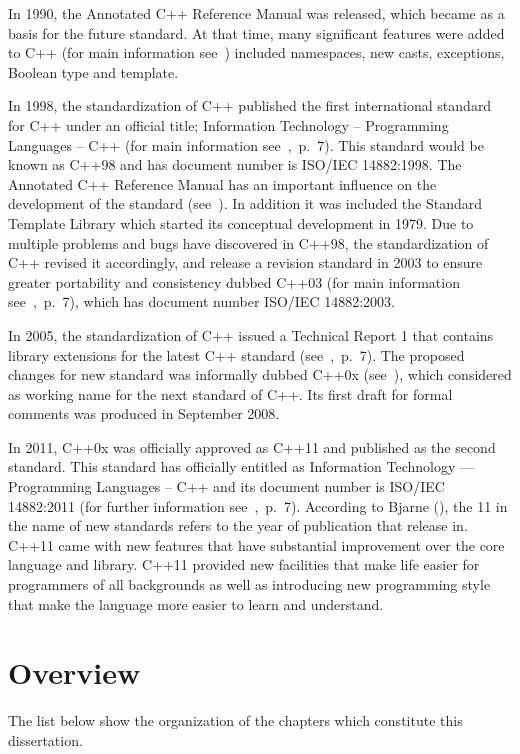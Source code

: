 \documentclass[11pt]{report}
\begin{document}
In 1990, the Annotated C++ Reference Manual was released, which became as a basis for the future standard. At that time, many significant features were added to C++  (for main information see~\cite{StroustrupHistory}) included namespaces, new casts, exceptions, Boolean type and template.

In 1998, the standardization of C++ published the first international standard for C++ under an official title; Information Technology -- Programming Languages -- C++ (for main information see~\cite{Josuttis:2012:CppStandard},~p.~7). This standard would be known as C++98 and has document number is ISO/IEC 14882:1998. The Annotated C++ Reference Manual has an important influence on the development of the standard (see~\cite{CplusplusHistoryofCpp}). In addition it was included the Standard Template Library which started its conceptual development in 1979. Due to multiple problems and bugs have discovered in C++98, the standardization of C++ revised it accordingly, and release a revision standard in 2003 to ensure greater portability and consistency dubbed C++03 (for main information see~\cite{Josuttis:2012:CppStandard},~p.~7), which has document number ISO/IEC 14882:2003.

In 2005, the standardization of C++ issued a Technical Report 1 that contains library extensions for the latest C++ standard (see~\cite{Josuttis:2012:CppStandard},~p.~7). The proposed changes for new standard was informally dubbed C++0x (see~\cite{CplusplusHistoryofCpp}), which considered as working name for the next standard of C++. Its first draft for formal comments was produced in September 2008. 

In 2011, C++0x was officially approved as C++11 and published as the second standard. This standard has officially entitled as Information Technology — Programming Languages -- C++ and its document number is ISO/IEC 14882:2011 (for further information see~\cite{Josuttis:2012:CppStandard},~p.~7). According to Bjarne (\cite{Stroustrup:2012:Cpp11}), the 11 in the name of new standards refers to the year of publication that release in. C++11 came with new features that have substantial improvement over the core language and library. C++11 provided new facilities that make life easier for programmers of all backgrounds as well as introducing new programming style  that make the language more easier to learn and understand.

\section{Overview}
\label{sec:Overview}
The list below show the organization of the chapters which constitute this dissertation.
\end{document}

